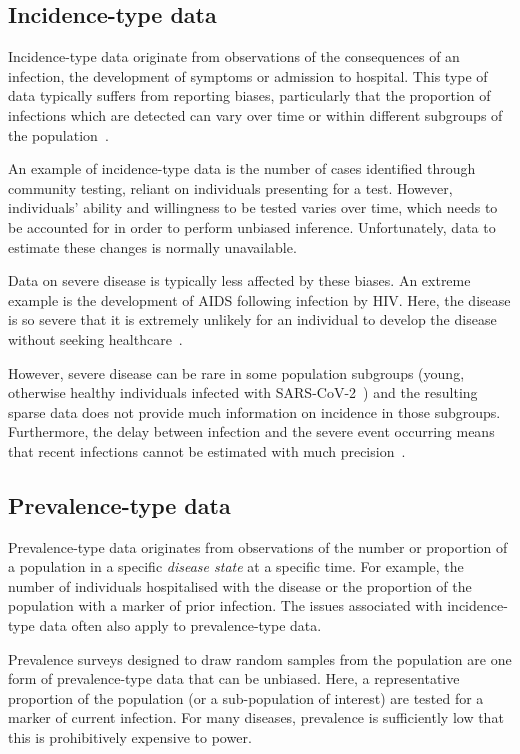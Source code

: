 \documentclass[thesis.tex]{subfiles}
\begin{document}
\subsection{Incidence-type data}

Incidence-type data originate from observations of the consequences of an infection, \eg the development of symptoms or admission to hospital.
This type of data typically suffers from reporting biases, particularly that the proportion of infections which are detected can vary over time or within different subgroups of the population~\autocites[chapter 9]{lashModern}{shadboltChallenges}.

An example of incidence-type data is the number of cases identified through community testing, reliant on individuals presenting for a test.
However, individuals' ability and willingness to be tested varies over time, which needs to be accounted for in order to perform unbiased inference.
Unfortunately, data to estimate these changes is normally unavailable.

Data on severe disease is typically less affected by these biases.
An extreme example is the development of AIDS following infection by HIV.
Here, the disease is so severe that it is extremely unlikely for an individual to develop the disease without seeking healthcare~\autocite{evansCompleteness}.

However, severe disease can be rare in some population subgroups (\eg young, otherwise healthy individuals infected with SARS-CoV-2~\autocite{wardSero,bhopalChildren}) and the resulting sparse data 
 does not provide much information on incidence in those subgroups.
Furthermore, the delay between infection and the severe event occurring means that recent infections cannot be estimated with much precision~\autocite{swallow2022challenges}.

\subsection{Prevalence-type data}

Prevalence-type data originates from observations of the number or proportion of a population in a specific \emph{disease state} at a specific time.
For example, the number of individuals hospitalised with the disease or the proportion of the population with a marker of prior infection.
The issues associated with incidence-type data often also apply to prevalence-type data.

Prevalence surveys designed to draw random samples from the population are one form of prevalence-type data that can be unbiased.
Here, a representative proportion of the population (or a sub-population of interest) are tested for a marker of current infection.
For many diseases, prevalence is sufficiently low that this is prohibitively expensive to power.
\end{document}
